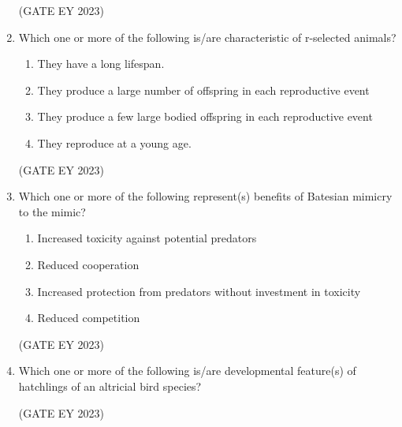 \documentclass[journal,12pt,onecolumn]{IEEEtran}
\theoremstyle{remark}
\begin{document}
\begin{enumerate}
\hfill{(GATE EY 2023)}



 \item Which one or more of the following is/are characteristic of r-selected animals?
\begin{enumerate}

\item They have a long lifespan.
\item They produce a large number of offspring in each reproductive event
\item They produce a few large bodied offspring in each reproductive event
\item They reproduce at a young age.


\end{enumerate}


\hfill{(GATE EY 2023)}

 \item Which one or more of the following represent(s) benefits of Batesian mimicry to
the mimic?

\begin{enumerate}

\item Increased toxicity against potential predators

\item Reduced cooperation
\item Increased protection from predators without investment in toxicity
\item Reduced competition



\end{enumerate}

\hfill{(GATE EY 2023)}


 \item Which one or more of the following is/are developmental feature(s) of hatchlings
of an altricial bird species?
\begin{enumerate}
\end{enumerate}
\hfill{(GATE EY 2023)}



\end{enumerate}
\end{document}
